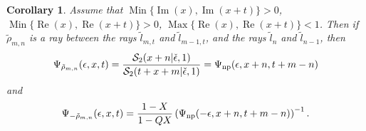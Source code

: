 \documentclass[pdftex]{sigma}
\numberwithin{equation}{section}
\newtheorem{Corollary}[Theorem]{Corollary}
\begin{document}
\begin{Corollary}\label{cortheorem2}
Assume that $\operatorname{Min}\{\operatorname{Im}(x),\operatorname{Im}(x+t)\}\!>0$, $\operatorname{Min}\{\operatorname{Re}(x),\operatorname{Re}(x+t)\}\!>0$, $\operatorname{Max}\{\operatorname{Re}(x),\allowbreak \operatorname{Re}(x+t)\}<1$. Then if $\tilde{\rho}_{m,n}$ is a ray between the rays $\widetilde{l}_{m,t}$ and $\widetilde{l}_{m-1,t}$, and the rays $\widetilde{l}_{n}$ and $\widetilde{l}_{n-1}$, then
\begin{equation*}
 \Psi_{\tilde{\rho}_{m,n}}(\epsilon,x,t)=\frac{\mathcal{S}_2(x+n|\check\epsilon,1)}{\mathcal{S}_2(t+x+m|\check\epsilon,1)}=\Psi_{{\rm np}}(\epsilon,x+n,t+m-n)
\end{equation*}
and
\begin{equation*}
 \Psi_{-{\tilde{\rho}_{m,n}}}(\epsilon,x,t) =\frac{1-X}{1-QX}\left(\Psi_{{\rm np}}(-\epsilon,x+n,t+m-n)\right)^{-1}.
\end{equation*}
\end{Corollary}
\end{document}
